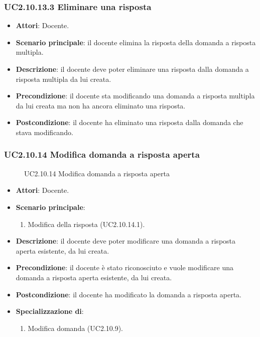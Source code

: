 \subsubsection{UC2.10.13.3 Eliminare una risposta}
\begin{itemize}
\item \textbf{Attori}: Docente.
\item \textbf{Scenario principale}: il docente elimina la risposta della domanda a risposta multipla.
\item \textbf{Descrizione}: il docente deve poter eliminare una risposta dalla domanda a risposta multipla da lui creata.
\item \textbf{Precondizione}: il docente sta modificando una domanda a risposta multipla da lui creata ma non ha ancora eliminato una risposta.
\item \textbf{Postcondizione}: il docente ha eliminato una risposta dalla domanda che stava modificando.
\end{itemize}
\subsubsection{UC2.10.14 Modifica domanda a risposta aperta}
\begin{figure}[H]
\centering
\noindent{}
\caption{UC2.10.14 Modifica domanda a risposta aperta}
\end{figure}
\begin{itemize}
\item \textbf{Attori}: Docente.
\item \textbf{Scenario principale}:
\begin{enumerate}
\item Modifica della risposta (UC2.10.14.1).
\end{enumerate}
\item \textbf{Descrizione}: il docente deve poter modificare una domanda a risposta aperta esistente, da lui creata.
\item \textbf{Precondizione}: il docente è stato riconosciuto e vuole modificare una domanda a risposta aperta esistente, da lui creata.
\item \textbf{Postcondizione}: il docente ha modificato la domanda a risposta aperta.
\item \textbf{Specializzazione di}:
\begin{enumerate}
\item Modifica domanda (UC2.10.9).
\end{enumerate}
\end{itemize}
